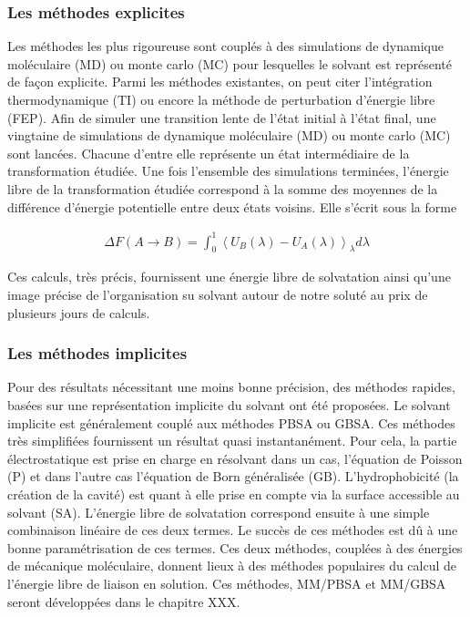 \subsubsection{Les méthodes explicites}
Les méthodes les plus rigoureuse sont couplés à des simulations de dynamique moléculaire (MD) ou monte carlo (MC) pour lesquelles le solvant est représenté de façon explicite. Parmi les méthodes existantes\cite{Skyner_review_2015, Hansen_Practical_2014, Christ_basic_2009}, on peut citer l'intégration thermodynamique (TI) ou encore la méthode de perturbation d'énergie libre (FEP). Afin de simuler une transition lente de l'état initial à l'état final, une vingtaine de simulations de dynamique moléculaire (MD) ou monte carlo (MC) sont lancées. Chacune d'entre elle représente un état intermédiaire de la transformation étudiée. Une fois l'ensemble des simulations terminées, l'énergie libre de la transformation étudiée correspond à la somme des moyennes de la différence d'énergie potentielle entre deux états voisins. Elle s'écrit sous la forme

\begin{eqnarray}
\Delta F(A \rightarrow B) =  \int_0^1 \left\langle U_B(\lambda) - U_A(\lambda) \right\rangle_{\lambda} d\lambda
\end{eqnarray}

Ces calculs, très précis, fournissent une énergie libre de solvatation ainsi qu'une image précise de l'organisation su solvant autour de notre soluté au prix de plusieurs jours de calculs.



\subsubsection{Les méthodes implicites}
Pour des résultats nécessitant une moins bonne précision, des méthodes rapides, basées sur une représentation implicite du solvant ont été proposées\cite{Skyner_review_2015}. Le solvant implicite est généralement couplé aux méthodes PBSA ou GBSA. Ces méthodes très simplifiées fournissent un résultat quasi instantanément. Pour cela, la partie électrostatique est prise en charge en résolvant dans un cas, l'équation de Poisson (P) et dans l'autre cas l'équation de Born généralisée (GB). L'hydrophobicité (la création de la cavité) est quant à elle prise en compte via la surface accessible au solvant (SA). L'énergie libre de solvatation correspond ensuite à une simple combinaison linéaire de ces deux termes. Le succès de ces méthodes est dû à une bonne paramétrisation de ces termes. Ces deux méthodes, couplées à des énergies de mécanique moléculaire, donnent lieux à des méthodes  populaires du calcul de l'énergie libre de liaison en solution. Ces méthodes, MM/PBSA\cite{Genheden__MMPBSA_2015} et MM/GBSA seront développées dans le chapitre XXX.

